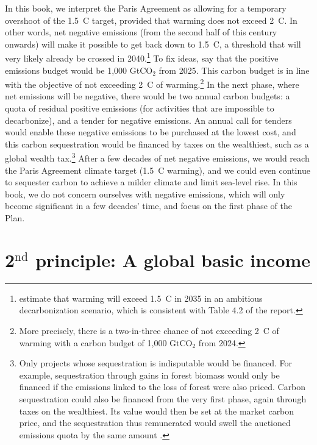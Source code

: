 \documentclass[a5paper,english,openany]{memoir}
\begin{document}
In this book, we interpret the Paris Agreement as allowing for a temporary overshoot of the 1.5~\textdegree{}C target, provided that warming does not exceed 2~\textdegree{}C. In other words, net negative emissions (from the second half of this century onwards) will make it possible to get back down to 1.5~\textdegree{}C, a threshold that will very likely already be crossed in 2040.\footnote{\citet{diffenbaugh_data-driven_2023} estimate that warming will exceed 1.5~\textdegree{}C in 2035 in an ambitious decarbonization scenario, which is consistent with Table 4.2 of the \citet{ipcc_climate_2021} report.} 
To fix ideas, say that the positive emissions budget would be 1,000 GtCO$_\text{2}$ from 2025. This carbon budget is in line with the objective of not exceeding 2~\textdegree{}C of warming.\footnote{More precisely, there is a two-in-three chance of not exceeding 2~\textdegree{}C of warming with a carbon budget of 1,000 GtCO$_\text{2}$ from 2024.} %
In the next phase, where net emissions will be negative, there would be two annual carbon budgets: a quota of residual positive emissions (for activities that are impossible to decarbonize), %
and a tender for negative emissions. An annual call for tenders would enable these negative emissions to be purchased at the lowest cost, and this carbon sequestration would be financed by taxes on the wealthiest, such as a global wealth tax.\footnote{Only projects whose sequestration is indisputable would be financed. For example, sequestration through gains in forest biomass would only be financed if the emissions linked to the loss of forest were also priced. Carbon sequestration could also be financed from the very first phase, again through taxes on the wealthiest. Its value would then be set at the market carbon price, and the sequestration thus remunerated would swell the auctioned emissions quota by the same amount \citep{edenhofer_governance_2023}.} %
After a few decades of net negative emissions, we would reach the Paris Agreement climate target (1.5~\textdegree{}C warming), and we could even continue to sequester carbon to achieve a milder climate and limit sea-level rise. In this book, we do not concern ourselves with negative emissions, which will only become significant in a few decades' time, and focus on the first phase of the Plan. 

\section*{2$^\text{nd}$ principle: A global basic income}\label{pcp:rdb}
\end{document}
